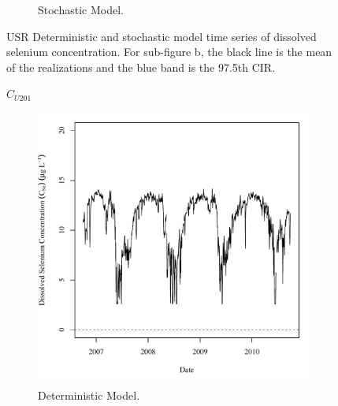 \begin{landscape}
\begin{figure}
\begin{subfigure}{0.7\textwidth}
			\caption{Stochastic Model.}
		\end{subfigure}
		\caption[USR Deterministic and stochastic model time series of dissolved selenium concentration.]{USR Deterministic and stochastic model time series of dissolved selenium concentration.  For sub-figure b, the black line is the mean of the realizations and the blue band is the 97.5th CIR.}
		\label{fig:concCSeTS_US}
	\end{figure}
\end{landscape}

\subfiguremid
\begin{landscape}
	\begin{figure}
		$ C_{U201} $
		\begin{subfigure}{0.7\textwidth}
			\centering
			\includegraphics[width=\tableCustomSize]{"Figures/Results_USR/Deterministic/c TS U201"}
			\caption{Deterministic Model.}
		\end{subfigure}%
		\begin{subfigure}{0.7\textwidth}
			\centering

\end{subfigure}
\end{figure}
\end{landscape}

